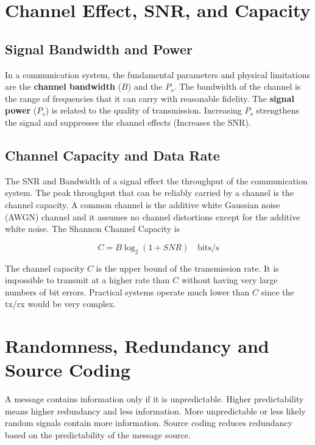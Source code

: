 \documentclass{article}
\begin{document}
     \section{Channel Effect, SNR, and Capacity}
     \subsection{Signal Bandwidth and Power}
     In a communication system, the fundamental parameters and physical limitations are the \textbf{channel bandwidth} ($B$) and the \textbf{$P_s$}. The bandwidth of 
     the channel is the range of frequencies that it can carry with reasonable fidelity. The \textbf{signal power} ($P_s$) is related to the quality of transmission.
     Increasing $P_s$ strengthens the signal and suppresses the channel effects (Increases the SNR). 

     \subsection{Channel Capacity and Data Rate}
     The SNR and Bandwidth of a signal effect the throughput of the communication system. The peak throughput that can be reliably carried by a channel is the
     channel capacity. A common channel is the additive white Gaussian noise (AWGN) channel and it assumes no channel distortions except for the additive white noise.
     The Shannon Channel Capacity is

     \begin{equation}  
          C = B \log_2 (1 + SNR) \quad \textrm{bits/s}
     \end{equation}

     The channel capacity $C$ is the upper bound of the transmission rate. It is impossible to transmit at a higher rate than $C$ without having very large
     numbers of bit errors. Practical systems operate much lower than $C$ since the tx/rx would be very complex.

     \section{Randomness, Redundancy and Source Coding}
     A message contains information only if it is unpredictable. Higher predictability means higher redundancy and less information. More unpredictable or less
     likely random signals contain more information. Source coding reduces redundancy based on the predictability of the message source. 

     
\end{document}
